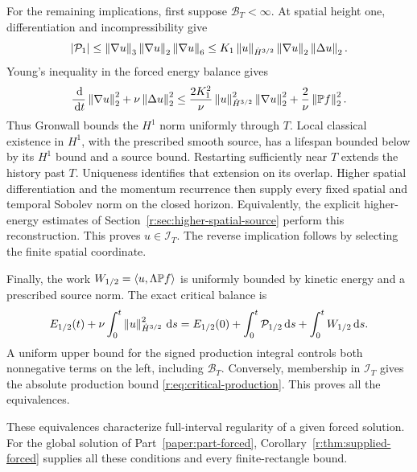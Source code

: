 For the remaining implications, first suppose \(\mathcal B_T<\infty\).
At spatial height one, differentiation and incompressibility give
\[
 |\mathcal P_1|
 \le\left\lVert \nabla u\right\rVert_3\left\lVert \nabla u\right\rVert_2\left\lVert \nabla u\right\rVert_6
 \le K_1\left\lVert u\right\rVert_{\dot H^{3/2}}\left\lVert \nabla u\right\rVert_2\left\lVert \Delta u\right\rVert_2.
\]
Young's inequality in the forced energy balance gives
\[
 \frac{\,\mathrm d}{\,\mathrm d t}\left\lVert \nabla u\right\rVert_2^2+\nu\left\lVert \Delta u\right\rVert_2^2
 \le\frac{2K_1^2}{\nu}\left\lVert u\right\rVert_{\dot H^{3/2}}^2
               \left\lVert \nabla u\right\rVert_2^2
       +\frac2\nu\left\lVert \mathbb P f\right\rVert_2^2.
\]
Thus Gronwall bounds the \(H^1\) norm uniformly through \(T\).
Local classical existence in \(H^1\), with the prescribed smooth source,
has a lifespan bounded below by its \(H^1\) bound and a source bound.
Restarting sufficiently near \(T\) extends the history past \(T\).
Uniqueness identifies that extension on its overlap.
Higher spatial differentiation and the momentum recurrence then supply
every fixed spatial and temporal Sobolev norm on the closed horizon.
Equivalently, the explicit higher-energy estimates of
Section~\ref{r:sec:higher-spatial-source} perform this reconstruction.
This proves \(u\in\mathscr I_T\).
The reverse implication follows by selecting the finite spatial coordinate.

Finally, the work \(W_{1/2}=\left\langle u,\Lambda\mathbb P f\right\rangle\) is uniformly bounded
by kinetic energy and a prescribed source norm. The exact critical balance
is
\[
 E_{1/2}(t)+\nu\int_0^t\left\lVert u\right\rVert_{\dot H^{3/2}}^2\,\mathrm d s
 =E_{1/2}(0)+\int_0^t\mathcal P_{1/2}\,\mathrm d s
                  +\int_0^tW_{1/2}\,\mathrm d s.
\]
A uniform upper bound for the signed production integral controls both
nonnegative terms on the left, including \(\mathcal B_T\).
Conversely, membership in \(\mathscr I_T\) gives the absolute production
bound \eqref{r:eq:critical-production}. This proves all the equivalences.

These equivalences characterize full-interval regularity of a given forced
solution. For the global solution of Part~\ref{paper:part-forced},
Corollary~\ref{r:thm:supplied-forced} supplies all these conditions and every
finite-rectangle bound.
